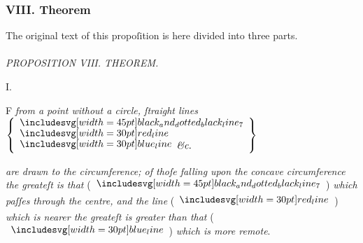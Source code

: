 \documentclass[12pt,preview]{standalone}
\begin{document}
\null\removelastskip\nointerlineskip\vspace*{-\baselineskip}

\subsubsection{VIII. Theorem}

\begin{minipage}[t]{0.64\textwidth}
    \vspace{0pt}

    \begin{center}
        The original text of this propoſition is here divided into three parts.\\
        \hfill\\
        \textit{PROPOSITION VIII. THEOREM.}\label{book3pr8}
    \end{center}

    \hfill

    \begin{center}
        I.\\
        \raggedright \lettrine[lines=4, loversize=1, nindent=0pt]{}{}F \textit{from a point without a circle, ſtraight lines}\\ $\left\{\begin{aligned}                                                    & \bimg{black_and_dotted_black_line_7} \\[-2ex] & \redline \\[-2ex] & \blueline \textit{\&c.}
            \end{aligned}\right\}$
    \end{center}
    \raggedright \textit{are drawn to the circumference; of thoſe falling upon the concave circumference the greateſt is that} (\hspace{-1ex}$\bimg{black_and_dotted_black_line_7}$\hspace{-1ex}) \textit{which paſſes through the centre, and the line} (\hspace{-1ex}$\redline$\hspace{-1ex}) \textit{which is nearer the greateſt is greater than  that} (\hspace{-1ex}$\blueline$\hspace{-1ex}) \textit{which is more remote}.

    \hfill

    \hfill


\end{minipage}
\end{document}
